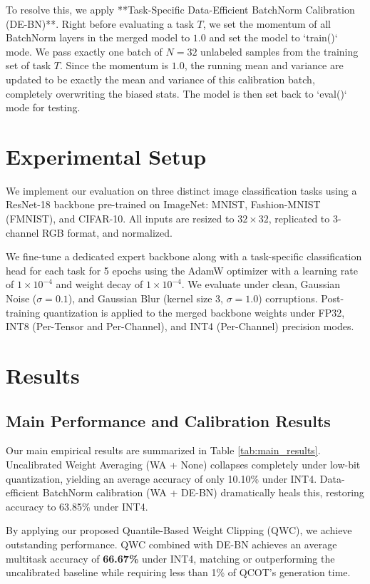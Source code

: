 \documentclass{article}
\theoremstyle{plain}
\theoremstyle{definition}
\theoremstyle{remark}
\begin{document}
To resolve this, we apply **Task-Specific Data-Efficient BatchNorm Calibration (DE-BN)**. Right before evaluating a task $T$, we set the momentum of all BatchNorm layers in the merged model to $1.0$ and set the model to `train()` mode. We pass exactly one batch of $N = 32$ unlabeled samples from the training set of task $T$. Since the momentum is $1.0$, the running mean and variance are updated to be exactly the mean and variance of this calibration batch, completely overwriting the biased stats. The model is then set back to `eval()` mode for testing.

\section{Experimental Setup}
We implement our evaluation on three distinct image classification tasks using a ResNet-18 backbone pre-trained on ImageNet: MNIST, Fashion-MNIST (FMNIST), and CIFAR-10. All inputs are resized to $32 \times 32$, replicated to 3-channel RGB format, and normalized. 

We fine-tune a dedicated expert backbone along with a task-specific classification head for each task for 5 epochs using the AdamW optimizer with a learning rate of $1 \times 10^{-4}$ and weight decay of $1 \times 10^{-4}$. We evaluate under clean, Gaussian Noise ($\sigma = 0.1$), and Gaussian Blur (kernel size 3, $\sigma = 1.0$) corruptions. Post-training quantization is applied to the merged backbone weights under FP32, INT8 (Per-Tensor and Per-Channel), and INT4 (Per-Channel) precision modes.

\section{Results}
\subsection{Main Performance and Calibration Results}
Our main empirical results are summarized in Table \ref{tab:main_results}.
Uncalibrated Weight Averaging (WA + None) collapses completely under low-bit quantization, yielding an average accuracy of only 10.10\% under INT4. Data-efficient BatchNorm calibration (WA + DE-BN) dramatically heals this, restoring accuracy to 63.85\% under INT4.

By applying our proposed Quantile-Based Weight Clipping (QWC), we achieve outstanding performance. QWC combined with DE-BN achieves an average multitask accuracy of \textbf{66.67\%} under INT4, matching or outperforming the uncalibrated baseline while requiring less than 1\% of QCOT's generation time.
\end{document}
